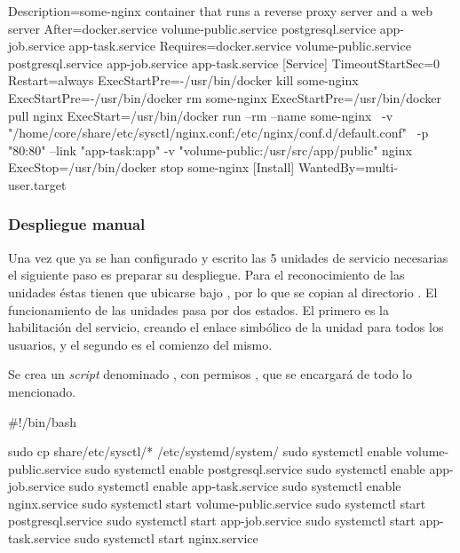 \begin{codelisting}
\label{code:nginx.service}
\begin{code}
[Unit] 
  Description=some-nginx container that runs a reverse proxy server and a 
              web server
  After=docker.service volume-public.service postgresql.service app-job.service 
        app-task.service
  Requires=docker.service volume-public.service postgresql.service 
           app-job.service app-task.service
[Service] 
  TimeoutStartSec=0
  Restart=always 
  ExecStartPre=-/usr/bin/docker kill some-nginx 
  ExecStartPre=-/usr/bin/docker rm some-nginx
  ExecStartPre=/usr/bin/docker pull nginx 
  ExecStart=/usr/bin/docker run --rm --name some-nginx \
  -v "/home/core/share/etc/sysctl/nginx.conf:/etc/nginx/conf.d/default.conf" \
  -p "80:80" --link "app-task:app" -v "volume-public:/usr/src/app/public" nginx 
  ExecStop=/usr/bin/docker stop some-nginx
[Install] 
  WantedBy=multi-user.target
\end{code}
\end{codelisting}

\subsubsection{Despliegue manual}

Una vez que ya se han configurado y escrito las 5 unidades de servicio necesarias el siguiente paso es preparar su despliegue. Para el reconocimiento de las unidades éstas tienen que ubicarse bajo , por lo que se copian al directorio . El funcionamiento de las unidades pasa por dos estados. El primero es la habilitación del servicio, creando el enlace simbólico de la unidad para todos los usuarios, y el segundo es el comienzo del mismo.

Se crea un \textit{script} denominado \kode{coreos-service-units-deploy.sh}, con permisos \kode{chmod +x}, que se encargará de todo lo mencionado.

\begin{codelisting}
\label{code:coreos-service-units-deploy}
\begin{code}
#!/bin/bash

sudo cp share/etc/sysctl/* /etc/systemd/system/
sudo systemctl enable volume-public.service
sudo systemctl enable postgresql.service
sudo systemctl enable app-job.service
sudo systemctl enable app-task.service
sudo systemctl enable nginx.service
sudo systemctl start volume-public.service
sudo systemctl start postgresql.service
sudo systemctl start app-job.service
sudo systemctl start app-task.service
sudo systemctl start nginx.service
\end{code}
\end{codelisting}

